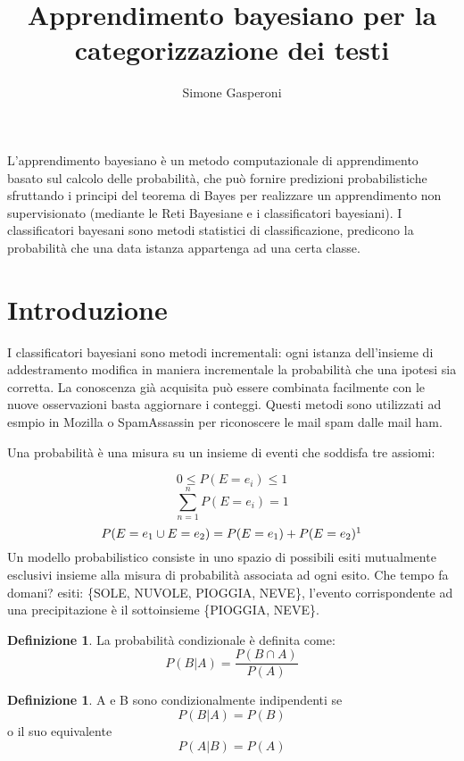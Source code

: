 \documentclass{article}
\title{Apprendimento bayesiano per la categorizzazione dei testi}
\author{Simone Gasperoni}
\theoremstyle{plain}
\theoremstyle{definition}
\newtheorem{defn}[]{Definizione} %
\begin{document}
\maketitle
L'apprendimento bayesiano è un metodo computazionale di apprendimento basato sul calcolo delle probabilità, che può fornire predizioni probabilistiche sfruttando i principi del teorema di Bayes per realizzare un apprendimento non supervisionato (mediante le Reti Bayesiane e i classificatori bayesiani). I classificatori bayesani sono metodi statistici di classificazione, predicono la probabilità che una data istanza appartenga ad una certa classe.

\section{Introduzione}
I classificatori bayesiani sono metodi incrementali: ogni istanza dell’insieme di addestramento modifica in maniera incrementale la probabilità che una ipotesi sia corretta.
La conoscenza già acquisita può essere combinata facilmente con le nuove osservazioni basta aggiornare i conteggi. Questi metodi sono utilizzati ad esmpio in Mozilla o SpamAssassin per riconoscere le mail spam dalle mail ham.\footnotemark


Una probabilità è una misura su un insieme di eventi che soddisfa tre assiomi:

$$0≤P(E=e_i)≤1$$
$$\sum_{n=1}^{n} P(E=e_i)=1$$
$$P(E=e_1\cup E=e_2)=P(E=e_1)+P(E=e_2)\footnotemark$$
Un modello probabilistico consiste in uno spazio di possibili esiti mutualmente esclusivi insieme alla misura di probabilità associata ad ogni esito.
Che tempo fa domani? esiti: \{SOLE, NUVOLE, PIOGGIA, NEVE\}, l’evento corrispondente ad una precipitazione è il sottoinsieme \{PIOGGIA, NEVE\}.
\begin{defn}
	La probabilità condizionale è definita come: $$P(B|A)=\frac{P(B \cap A)}{P(A)}$$
\end{defn}
\begin{defn}
	A e B sono condizionalmente indipendenti se $$P(B|A)=P(B)$$ o il suo equivalente $$P(A|B)=P(A)$$
\end{defn}
\end{document}
